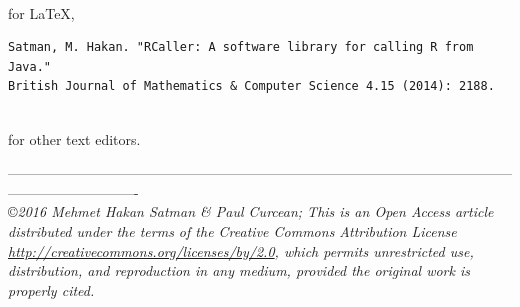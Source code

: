 \documentclass[10pt,a4paper, final, oneside]{article}
\begin{document}
\noindent \\ for \LaTeX,  \\

\begin{minipage}{\linewidth}
\begin{verbatim}
Satman, M. Hakan. "RCaller: A software library for calling R from Java." 
British Journal of Mathematics & Computer Science 4.15 (2014): 2188.
\end{verbatim}
\end{minipage}

\noindent \\ for other text editors.


\scriptsize\-----------------------------------------------------------------------------------------------------------------------------------------\\\copyright \it 2016  Mehmet Hakan Satman \& Paul Curcean; This is an Open Access article distributed under the terms of the Creative Commons Attribution License
\href{http://creativecommons.org/licenses/by/2.0}{http://creativecommons.org/licenses/by/2.0},  which permits unrestricted use, distribution, and reproduction in any medium,
provided the original work is properly cited.
\end{document}
